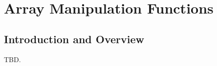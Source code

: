 \chapter{Array Manipulation Functions}
\label{cami0}


\section{Introduction and Overview}
\label{cami0:siov0}

TBD.


